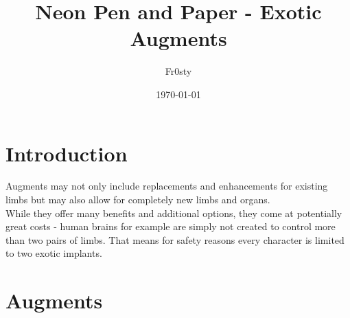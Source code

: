 \documentclass[12pt,a4paper,openany]{book}
\title{Neon Pen and Paper - Exotic Augments}
\author{Fr0sty}
\date{\today}
\begin{document}
	
	
    \chapter{Introduction}
    Augments may not only include replacements and enhancements for existing limbs but may also allow for completely new limbs and organs.\\
    While they offer many benefits and additional options, they come at potentially great costs - human brains for example are simply not created to control more than two pairs of limbs. That means for safety reasons every character is limited to two exotic implants.

    \chapter{Augments}
\end{document}
